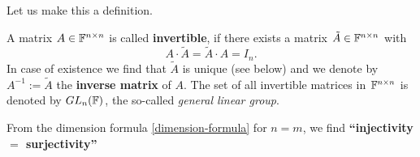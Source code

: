 \begin{frame} 
	Let us make this a definition.
	\vspace{0.25cm}
	\begin{defi} \label{def2.5} 
		A matrix $A \in {\mathbb{F}}^{n\times n}$ is called {\bf invertible}, if there exists 
		a matrix $\tilde{A} \in {\mathbb{F}}^{n\times n}$ with 
		\begin{equation} \label{eq:definvertible_mat}
		A\cdot\tilde{A}  = \tilde{A}\cdot A=
		I_n.
		\end{equation}
		In case of existence we find that $\tilde{A}$ is unique (see below) and we denote by $A^{-1}:= \tilde{A}$ the {\bf inverse matrix} 
		of $A$. The set of all invertible matrices in ${\mathbb{F}}^{n\times n}$ is denoted by $GL_n ({\mathbb{F}} )$, the so-called {\em
			general linear group}.   
	\end{defi}
\end{frame}






\begin{frame}
	From the dimension formula \ref{dimension-formula} for $n=m$, we find \textbf{``injectivity $=$ surjectivity''}\\~\\
\end{frame}


